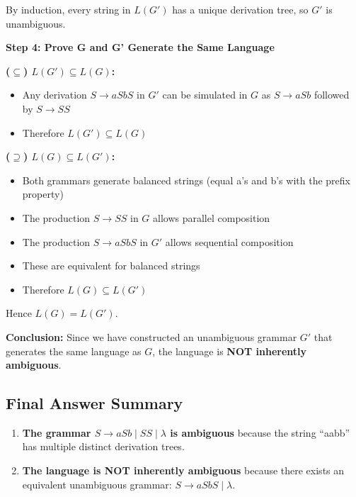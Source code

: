 \documentclass[12pt]{article}
\begin{document}
By induction, every string in $L(G')$ has a unique derivation tree, so $G'$ is unambiguous.

\textbf{Step 4: Prove G and G' Generate the Same Language}

\textbf{($\subseteq$) $L(G') \subseteq L(G)$:}
\begin{itemize}
\item Any derivation $S \to aSbS$ in $G'$ can be simulated in $G$ as $S \to aSb$ followed by $S \to SS$
\item Therefore $L(G') \subseteq L(G)$ \checkmark
\end{itemize}

\textbf{($\supseteq$) $L(G) \subseteq L(G')$:}
\begin{itemize}
\item Both grammars generate balanced strings (equal a's and b's with the prefix property)
\item The production $S \to SS$ in $G$ allows parallel composition
\item The production $S \to aSbS$ in $G'$ allows sequential composition
\item These are equivalent for balanced strings
\item Therefore $L(G) \subseteq L(G')$ \checkmark
\end{itemize}

Hence $L(G) = L(G')$.

\textbf{Conclusion:} Since we have constructed an unambiguous grammar $G'$ that generates the same language as $G$, the language is \textbf{NOT inherently ambiguous}. \checkmark

\subsection{Final Answer Summary}

\begin{enumerate}
\item \textbf{The grammar $S \to aSb \mid SS \mid \lambda$ is ambiguous} because the string ``aabb'' has multiple distinct derivation trees.

\item \textbf{The language is NOT inherently ambiguous} because there exists an equivalent unambiguous grammar: $S \to aSbS \mid \lambda$.
\end{enumerate}

\end{document}
